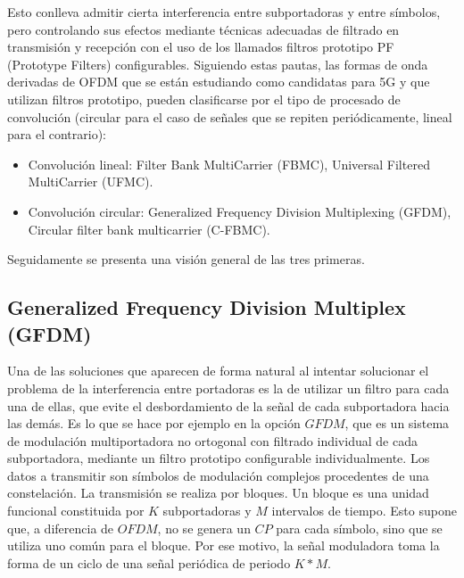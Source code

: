 \documentclass[]{article}
\begin{document}
Esto conlleva admitir cierta interferencia entre subportadoras y entre símbolos, pero controlando sus efectos mediante técnicas adecuadas de filtrado en transmisión y recepción con el uso de los llamados filtros prototipo PF (Prototype Filters) configurables.
Siguiendo estas pautas, las formas de onda derivadas de OFDM que se están estudiando como candidatas para 5G y que utilizan filtros prototipo, pueden clasificarse por el tipo de procesado de convolución (circular para el caso de señales que se repiten periódicamente, lineal para el contrario):

\begin{itemize}
	\item Convolución lineal: Filter Bank MultiCarrier (FBMC), Universal Filtered MultiCarrier (UFMC).
	\item Convolución circular: Generalized Frequency Division Multiplexing (GFDM), Circular filter bank multicarrier (C-FBMC). 
	
\end{itemize}

Seguidamente se presenta una visión general de las tres primeras.

\subsection{Generalized Frequency Division Multiplex (GFDM) 
	}
	
Una de las soluciones que aparecen de forma natural al intentar solucionar el problema de la interferencia entre portadoras es la de utilizar un filtro para cada una de ellas, que evite el desbordamiento de la señal de cada subportadora hacia las demás. Es lo que se hace por ejemplo en la opción $GFDM$, que es un sistema de modulación multiportadora no ortogonal con filtrado individual de cada subportadora, mediante un filtro prototipo configurable individualmente. Los datos a transmitir son símbolos de modulación complejos procedentes de una constelación. La transmisión se realiza por bloques. Un bloque es una unidad funcional constituida por $K$ subportadoras y $M$ intervalos de tiempo. Esto supone que, a diferencia de $OFDM$, no se genera un $CP$ para cada símbolo, sino que se utiliza uno común para el bloque. Por ese motivo, la señal moduladora toma la forma de un ciclo de una señal periódica de periodo $K*M$.\\
\end{document}
